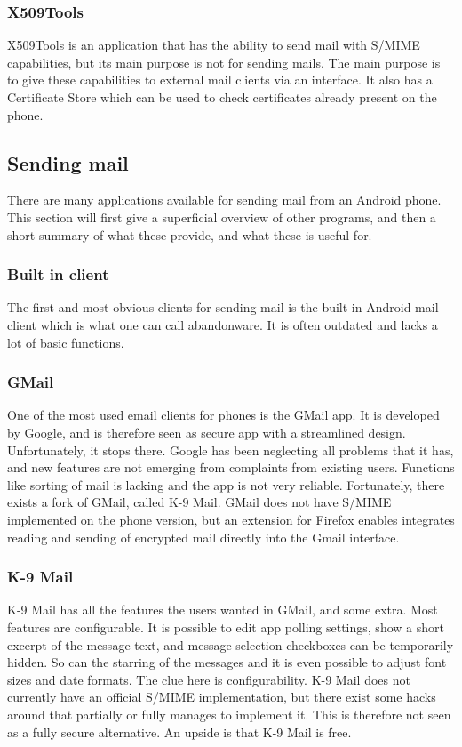 \subsubsection{X509Tools}
X509Tools is an application that has the ability to send mail with S/MIME capabilities, but its main purpose is not for sending mails. The main purpose is to give these capabilities to external mail clients via an interface. It also has a Certificate Store which can be used to check certificates already present on the phone. 

\subsection{Sending mail}
There are many applications available for sending mail from an Android phone. This section will first give a superficial overview of other programs, and then a short summary of what these provide, and what these is useful for.

\subsubsection{Built in client}
The first and most obvious clients for sending mail is the built in Android mail client which is what one can call abandonware. It is often outdated and lacks a lot of basic functions.

\subsubsection{GMail}
One of the most used email clients for phones is the GMail app. It is developed by Google, and is therefore seen as secure app with a streamlined design. Unfortunately, it stops there. Google has been neglecting all problems that it has, and new features are not emerging from complaints from existing users. Functions like sorting of mail is lacking and the app is not very reliable. Fortunately, there exists a fork of GMail, called K-9 Mail. GMail does not have S/MIME implemented on the phone version, but an extension for Firefox enables integrates reading and sending of encrypted mail directly into the Gmail interface\cite{bib:gmail}.

\subsubsection{K-9 Mail}
K-9 Mail has all the features the users wanted in GMail, and some extra. Most features are configurable. It is possible to edit app polling settings, show a short excerpt of the message text, and message selection checkboxes can be temporarily hidden. So can the starring of the messages and it is even possible to adjust font sizes and date formats. The clue here is configurability. K-9 Mail does not currently have an official S/MIME implementation, but there exist some hacks around that partially or fully manages to implement it. This is therefore not seen as a fully secure alternative. An upside is that K-9 Mail is free.


